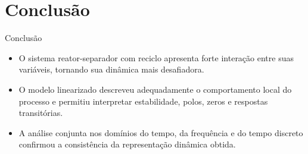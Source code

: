 \section{Conclusão}

\begin{frame}{Conclusão}
  \begin{itemize}
    \item O sistema reator-separador com reciclo apresenta forte interação entre suas variáveis, tornando sua dinâmica mais desafiadora.

    \item O modelo linearizado descreveu adequadamente o comportamento local do processo e permitiu interpretar estabilidade, polos, zeros e respostas transitórias.

    \item A análise conjunta nos domínios do tempo, da frequência e do tempo discreto confirmou a consistência da representação dinâmica obtida.
  \end{itemize}
\end{frame}
